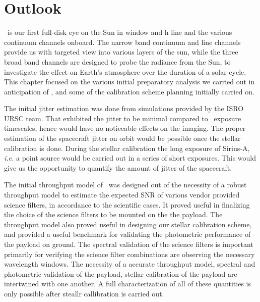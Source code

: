 
\section{Outlook}\label{sec:c3_outlook}

\suit~is our first full-disk eye on the Sun in  window and  h line  and the various continuum channels onboard. The narrow band continuum and line channels provide us with targeted view into various layers of the sun, while the three broad band channels are designed to probe the radiance from the Sun, to investigate the effect on Earth's atmosphere over the duration of a solar cycle. This chapter focused on the various initial preparatory analysis we carried out in anticipation of \suit, and some of the calibration scheme planning initially carried on.

The initial jitter estimation was done from simulations provided by the ISRO URSC team. That exhibited the jitter to be minimal compared to \suit~exposure timescales, hence would have no noticeable effects on the imaging. The proper estimation of the spacecraft jitter on orbit would be possible once the stellar calibration is done. During the stellar calibration the long exposure of Sirius-A, {\it i.e.} a point source would be carried out in a series of short exposures. This would give us the opportunity to quantify the amount of jitter of the spacecraft.

The initial throughput model of \suit~was designed out of the necessity of a robust throughput model to estimate the expected SNR of various vendor provided science filters, in accordance to the scientific cases. It proved useful in finalizing the choice of the science filters to be mounted on the the payload. The throughput model also proved useful in designing our stellar calibration scheme, and provided a useful benchmark for validating the photometric performance of the payload on ground. The spectral validation of the science filters is important primarily for verifying the science filter combinations are observing the necessary wavelength windows. The necessity of a accurate throughput model, spectral and photometric validation of the payload, stellar calibration of the payload are intertwined with one another. A full characterization of all of these quantities is only possible after steallr callibration is carried out. 